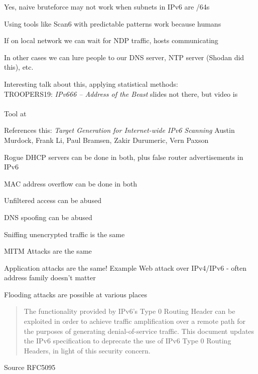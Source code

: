 \documentclass[Screen16to9,17pt]{foils}
\begin{document}

\begin{list2}
\item Yes, naive bruteforce may not work when subnets in IPv6 are /64s
\item Using tools like Scan6 with predictable patterns work because humans
\item If on local network we can wait for NDP traffic, hosts communicating
\item In other cases we can lure people to our DNS server, NTP server (Shodan did this), etc.
\end{list2}

Interesting talk about this, applying statistical methods:\\
TROOPERS19: \emph{IPv666 – Address of the Beast} slides not there, but video is\\
\\
Tool at 


References this: \emph{Target Generation for Internet-wide IPv6 Scanning}
Austin Murdock, Frank Li, Paul Bramsen, Zakir Durumeric, Vern Paxson



\begin{list2}
\item Rogue DHCP servers can be done in both, plus false router advertisements in IPv6
\item MAC address overflow can be done in both
\item Unfiltered access can be abused
\item DNS spoofing can be abused
\item Sniffing unencrypted traffic is the same
\item MITM Attacks are the same {\myalert}
\item Application attacks are the same! Example Web attack over IPv4/IPv6 - often address family doesn't matter {\myalert}
\item Flooding attacks are possible at various places
\end{list2}



\begin{quote}
The functionality provided by IPv6's Type 0 Routing Header can be exploited in order to achieve traffic amplification over a remote path for the purposes of generating denial-of-service traffic.  This document updates the IPv6 specification to deprecate the use of IPv6 Type 0 Routing Headers, in light of this security concern.
\end{quote}
Source RFC5095
\end{document}

